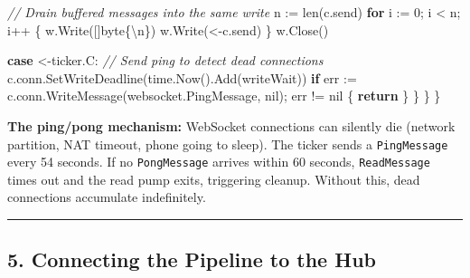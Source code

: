 \documentclass[
]{article}
\newenvironment{Shaded}{}{}
\newcommand{\BuiltInTok}[1]{\textcolor[rgb]{0.00,0.50,0.00}{#1}}
\newcommand{\CharTok}[1]{\textcolor[rgb]{0.25,0.44,0.63}{#1}}
\newcommand{\CommentTok}[1]{\textcolor[rgb]{0.38,0.63,0.69}{\textit{#1}}}
\newcommand{\ControlFlowTok}[1]{\textcolor[rgb]{0.00,0.44,0.13}{\textbf{#1}}}
\newcommand{\DataTypeTok}[1]{\textcolor[rgb]{0.56,0.13,0.00}{#1}}
\newcommand{\DecValTok}[1]{\textcolor[rgb]{0.25,0.63,0.44}{#1}}
\newcommand{\NormalTok}[1]{#1}
\newcommand{\OperatorTok}[1]{\textcolor[rgb]{0.40,0.40,0.40}{#1}}
\newcommand{\OtherTok}[1]{\textcolor[rgb]{0.00,0.44,0.13}{#1}}
\begin{document}
\begin{Shaded}
\begin{Highlighting}[]
            \CommentTok{// Drain buffered messages into the same write}
\NormalTok{            n }\OperatorTok{:=} \BuiltInTok{len}\OperatorTok{(}\NormalTok{c}\OperatorTok{.}\NormalTok{send}\OperatorTok{)}
            \ControlFlowTok{for}\NormalTok{ i }\OperatorTok{:=} \DecValTok{0}\OperatorTok{;}\NormalTok{ i }\OperatorTok{\textless{}}\NormalTok{ n}\OperatorTok{;}\NormalTok{ i}\OperatorTok{++} \OperatorTok{\{}
\NormalTok{                w}\OperatorTok{.}\NormalTok{Write}\OperatorTok{([]}\DataTypeTok{byte}\OperatorTok{\{}\CharTok{\textquotesingle{}\textbackslash{}n\textquotesingle{}}\OperatorTok{\})}
\NormalTok{                w}\OperatorTok{.}\NormalTok{Write}\OperatorTok{(\textless{}{-}}\NormalTok{c}\OperatorTok{.}\NormalTok{send}\OperatorTok{)}
            \OperatorTok{\}}
\NormalTok{            w}\OperatorTok{.}\NormalTok{Close}\OperatorTok{()}

        \ControlFlowTok{case} \OperatorTok{\textless{}{-}}\NormalTok{ticker}\OperatorTok{.}\NormalTok{C}\OperatorTok{:}
            \CommentTok{// Send ping to detect dead connections}
\NormalTok{            c}\OperatorTok{.}\NormalTok{conn}\OperatorTok{.}\NormalTok{SetWriteDeadline}\OperatorTok{(}\NormalTok{time}\OperatorTok{.}\NormalTok{Now}\OperatorTok{().}\NormalTok{Add}\OperatorTok{(}\NormalTok{writeWait}\OperatorTok{))}
            \ControlFlowTok{if}\NormalTok{ err }\OperatorTok{:=}\NormalTok{ c}\OperatorTok{.}\NormalTok{conn}\OperatorTok{.}\NormalTok{WriteMessage}\OperatorTok{(}\NormalTok{websocket}\OperatorTok{.}\NormalTok{PingMessage}\OperatorTok{,} \OtherTok{nil}\OperatorTok{);}\NormalTok{ err }\OperatorTok{!=} \OtherTok{nil} \OperatorTok{\{}
                \ControlFlowTok{return}
            \OperatorTok{\}}
        \OperatorTok{\}}
    \OperatorTok{\}}
\OperatorTok{\}}
\end{Highlighting}
\end{Shaded}

\textbf{The ping/pong mechanism:} WebSocket connections can silently die
(network partition, NAT timeout, phone going to sleep). The ticker sends
a \texttt{PingMessage} every 54 seconds. If no \texttt{PongMessage}
arrives within 60 seconds, \texttt{ReadMessage} times out and the read
pump exits, triggering cleanup. Without this, dead connections
accumulate indefinitely.

\begin{center}\rule{0.5\linewidth}{0.5pt}\end{center}

\hypertarget{connecting-the-pipeline-to-the-hub}{%
\subsection{5. Connecting the Pipeline to the
Hub}\label{connecting-the-pipeline-to-the-hub}}
\end{document}
